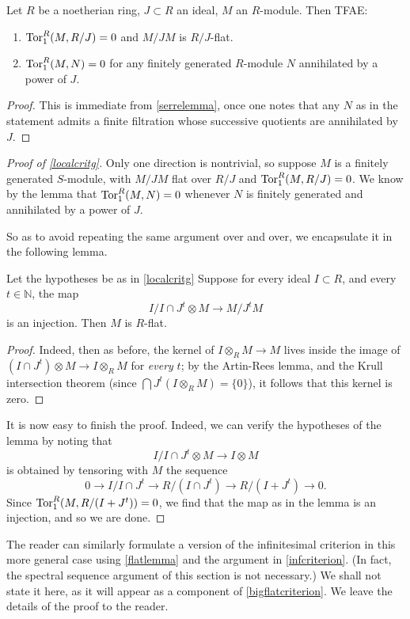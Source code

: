 \begin{lemma} 
Let $R$ be a noetherian ring, $J \subset R$ an ideal, $M$ an $R$-module. Then TFAE:
\begin{enumerate}
\item $\operatorname{Tor}_1^R(M, R/J) = 0$ and $M/JM$ is $R/J$-flat. 
\item $\operatorname{Tor}_1^R(M, N) = 0$ for any finitely generated $R$-module $N$
annihilated by a power of $J$.
\end{enumerate}
\end{lemma} 
\begin{proof} 
This is immediate from \cref{serrelemma}, once one notes that any $N$ as in the
statement admits a finite filtration whose successive quotients are annihilated
by $J$.
\end{proof} 
\begin{proof}[Proof of \cref{localcritg}]
Only one direction is nontrivial, so suppose $M$ is a finitely generated
$S$-module, with $M/JM$ flat over $R/J$ and $\operatorname{Tor}_1^R(M, R/J) = 0$.
We know by the lemma that $\operatorname{Tor}_1^R(M, N) = 0$ whenever $N$ is finitely
generated and annihilated by a power of $J$.


So as to avoid repeating the same argument over and over, we encapsulate it in
the following lemma.
\begin{lemma} \label{flatlemma} Let the hypotheses be as in \cref{localcritg}
Suppose for every ideal $I \subset R$, and every $t \in \mathbb{N}$, the map
\[ I/I \cap J^t \otimes M \to M/J^t M  \]
is an injection. Then $M$ is $R$-flat.
\end{lemma} 
\begin{proof} 
Indeed, then as before, the kernel of $I \otimes_R M \to M$ lives inside the image of $(I \cap J^t)
\otimes M \to I \otimes_R M$ for \emph{every} $t$; by the Artin-Rees lemma, and the Krull
intersection theorem (since $\bigcap J^t(I \otimes_R M) = \{0\}$), it follows that this kernel is zero.
\end{proof} 

It is now easy to finish the proof. Indeed, we can verify the hypotheses of the
lemma by noting that
\[ I /I \cap J^t \otimes M \to I \otimes M  \]
is obtained by tensoring with $M$ the sequence
\[ 0 \to I/I \cap J^t \to R/(I \cap J^t) \to R/(I + J^t) \to 0.  \]
Since $\operatorname{Tor}_1^R(M, R/(I + J^t)) = 0$, we find that the map as in the lemma is
an injection, and so we are done.
\end{proof} 

The reader can similarly formulate a version of the infinitesimal criterion in
this more general case using \cref{flatlemma} and the argument in
\cref{infcriterion}. (In fact, the spectral sequence argument of this section
is not necessary.) We shall not state it here, as it will appear as a
component of \cref{bigflatcriterion}. We leave the details of the proof to the reader.


